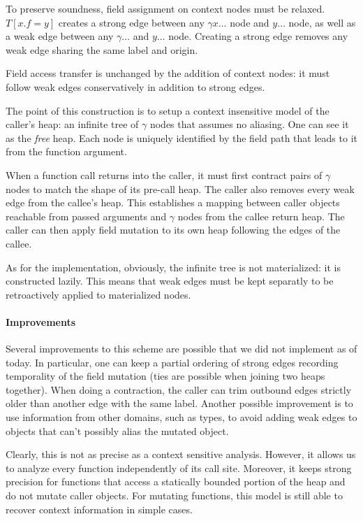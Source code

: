 \documentclass[11pt]{article}
\begin{document}
To preserve soundness, field assignment on context nodes must be relaxed. 
$T[x.f=y]$ creates a strong edge between any $\gamma x \dots$ node and $y\dots$ node, as well as a weak edge between any $\gamma\dots$ and $y\dots$ node.
Creating a strong edge removes any weak edge sharing the same label and origin.

Field access transfer is unchanged by the addition of context nodes: it must follow weak edges conservatively in addition to strong edges.

The point of this construction is to setup a context insensitive model of the caller's heap: an infinite tree of $\gamma$ nodes that assumes no aliasing.
One can see it as the \emph{free} heap. Each node is uniquely identified by the field path that leads to it from the function argument.

When a function call returns into the caller, it must first contract pairs of $\gamma$ nodes to match the shape of its pre-call heap.
The caller also removes every weak edge from the callee's heap.
This establishes a mapping between caller objects reachable from passed arguments and $\gamma$ nodes from the callee return heap.
The caller can then apply field mutation to its own heap following the edges of the callee.

As for the implementation, obviously, the infinite tree is not materialized: it is constructed lazily.
This means that weak edges must be kept separatly to be retroactively applied to materialized nodes.

\paragraph{Improvements} Several improvements to this scheme are possible that we did not implement as of today.
In particular, one can keep a partial ordering of strong edges recording temporality of the field mutation (ties are possible when joining two heaps together).
When doing a contraction, the caller can trim outbound edges strictly older than another edge with the same label.
Another possible improvement is to use information from other domains, such as types, to avoid adding weak edges to objects that can't possibly alias the mutated object.

Clearly, this is not as precise as a context sensitive analysis.
However, it allows us to analyze every function independently of its call site.
Moreover, it keeps strong precision for functions that access a statically bounded portion of the heap and do not mutate caller objects.
For mutating functions, this model is still able to recover context information in simple cases.
\end{document}

